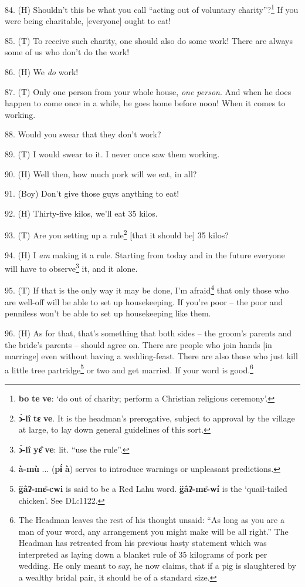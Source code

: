 84. (H) Shouldn't this be what you call ``acting out of voluntary charity''?\footnote{\textbf{bo} \textbf{te} \textbf{ve}: `do out of charity; perform a Christian religious ceremony'.}
If you were being charitable, [everyone] ought to eat!

85. (T) To receive such charity, one should also do some work! There are always
some of us who don't do the work!

86. (H) We \textit{do }work!

87. (T) Only one person from your whole house, \textit{one person}. And when he
does happen to come once in a while, he goes home before noon! When it comes to
working.

88. Would you swear that they don't work?

89. (T) I would swear to it. I never once saw them working.

90. (H) Well then, how much pork will we eat, in all?

91. (Boy) Don't give those guys anything to eat!

92. (H) Thirty-five kilos, we'll eat 35 kilos.

93. (T) Are you setting up a rule\footnote{\textbf{ɔ̀-lî} \textbf{tɛ} \textbf{ve}. It is the headman's prerogative, subject to approval by the village at large, to lay down general guidelines of this sort.} [that it should be] 35 kilos?

94. (H) I \textit{am} making it a rule. Starting from today and in the future everyone
will have to observe\footnote{\textbf{ɔ̀-lî} \textbf{yɛ̂} \textbf{ve}: lit. ``use the rule''.} it, and it alone.

95. (T) If that is the only way it may be done, I'm afraid\footnote{\textbf{à-mù} ... (\textbf{pɨ́} \textbf{à}) serves to introduce warnings or unpleasant predictions.} that only those
who are well-off will be able to set up housekeeping. If you're poor -- the poor
and penniless won't be able to set up housekeeping like them.

96. (H) As for that, that's something that both sides -- the groom's parents and
the bride's parents -- should agree on. There are people who join hands [in marriage]
even without having a wedding-feast. There are also those who just kill a little
tree partridge\footnote{\textbf{g̈âʔ-mɛ̄-cwi} is said to be a Red Lahu word. \textbf{g̈âʔ-mɛ̄-wí} is the `quail-tailed chicken'. See DL:1122.} or two and get married. If your word is good.\footnote{The Headman leaves the rest of his thought unsaid: ``As long as you are a man of your word, any arrangement you might make will be all right.'' The Headman has retreated from his previous hasty statement which was interpreted as laying down a blanket rule of 35 kilograms of pork per wedding. He only meant to say, he now claims, that if a pig is slaughtered by a wealthy bridal pair, it should be of a standard size.}

